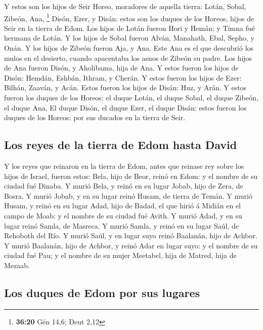  Y estos son los hijos de Seir Horeo, moradores de aquella
tierra: Lotán, Sobal, Zibeón, Ana, \footnote{\textbf{36:20} Gén 14,6;
  Deut 2,12}  Disón, Ezer, y Disán: estos son los duques de
los Horeos, hijos de Seir en la tierra de Edom.  Los hijos
de Lotán fueron Hori y Hemán; y Timna fué hermana de Lotán.
 Y los hijos de Sobal fueron Alván, Manahath, Ebal, Sepho,
y Onán.  Y los hijos de Zibeón fueron Aja, y Ana. Este Ana
es el que descubrió los mulos en el desierto, cuando apacentaba los
asnos de Zibeón su padre.  Los hijos de Ana fueron Disón, y
Aholibama, hija de Ana.  Y estos fueron los hijos de Disón:
Hemdán, Eshbán, Ithram, y Cherán.  Y estos fueron los hijos
de Ezer: Bilhán, Zaaván, y Acán.  Estos fueron los hijos de
Disán: Huz, y Arán.  Y estos fueron los duques de los
Horeos: el duque Lotán, el duque Sobal, el duque Zibeón, el duque Ana,
 El duque Disón, el duque Ezer, el duque Disán: estos
fueron los duques de los Horeos: por sus ducados en la tierra de Seir.

\hypertarget{los-reyes-de-la-tierra-de-edom-hasta-david}{%
\subsection{Los reyes de la tierra de Edom hasta
David}\label{los-reyes-de-la-tierra-de-edom-hasta-david}}

 Y los reyes que reinaron en la tierra de Edom, antes que
reinase rey sobre los hijos de Israel, fueron estos:  Bela,
hijo de Beor, reinó en Edom: y el nombre de su ciudad fué Dinaba.
 Y murió Bela, y reinó en su lugar Jobab, hijo de Zera, de
Bosra.  Y murió Jobab, y en su lugar reinó Husam, de tierra
de Temán.  Y murió Husam, y reinó en su lugar Adad, hijo de
Badad, el que hirió á Midián en el campo de Moab: y el nombre de su
ciudad fué Avith.  Y murió Adad, y en su lugar reinó Samla,
de Masreca.  Y murió Samla, y reinó en su lugar Saúl, de
Rehoboth del Río.  Y murió Saúl, y en lugar suyo reinó
Baalanán, hijo de Achbor.  Y murió Baalanán, hijo de
Achbor, y reinó Adar en lugar suyo: y el nombre de su ciudad fué Pau; y
el nombre de su mujer Meetabel, hija de Matred, hija de Mezaab.

\hypertarget{los-duques-de-edom-por-sus-lugares}{%
\subsection{Los duques de Edom por sus
lugares}\label{los-duques-de-edom-por-sus-lugares}}

